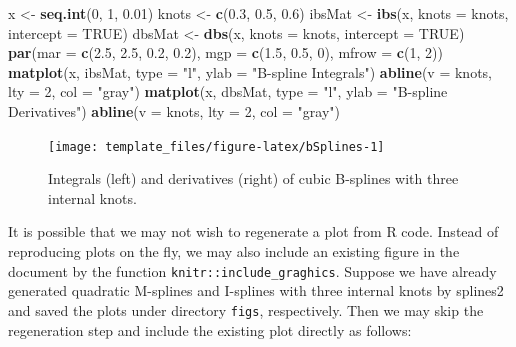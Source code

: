 \documentclass[11pt,letterpaper,]{article}
\newenvironment{Shaded}{\begin{snugshade}}{\end{snugshade}}
\newcommand{\DataTypeTok}[1]{\textcolor[rgb]{0.13,0.29,0.53}{#1}}
\newcommand{\DecValTok}[1]{\textcolor[rgb]{0.00,0.00,0.81}{#1}}
\newcommand{\FloatTok}[1]{\textcolor[rgb]{0.00,0.00,0.81}{#1}}
\newcommand{\KeywordTok}[1]{\textcolor[rgb]{0.13,0.29,0.53}{\textbf{#1}}}
\newcommand{\NormalTok}[1]{#1}
\newcommand{\OtherTok}[1]{\textcolor[rgb]{0.56,0.35,0.01}{#1}}
\newcommand{\StringTok}[1]{\textcolor[rgb]{0.31,0.60,0.02}{#1}}
\newcommand{\pkg}[1]{{\normalfont\fontseries{b}\selectfont #1}}
\let\proglang=\textsf
\theoremstyle{definition}
\theoremstyle{definition}
\theoremstyle{definition}
\theoremstyle{remark}
\begin{document}
\begin{Shaded}
\begin{Highlighting}[]
\NormalTok{x <-}\StringTok{ }\KeywordTok{seq.int}\NormalTok{(}\DecValTok{0}\NormalTok{, }\DecValTok{1}\NormalTok{, }\FloatTok{0.01}\NormalTok{)}
\NormalTok{knots <-}\StringTok{ }\KeywordTok{c}\NormalTok{(}\FloatTok{0.3}\NormalTok{, }\FloatTok{0.5}\NormalTok{, }\FloatTok{0.6}\NormalTok{)}
\NormalTok{ibsMat <-}\StringTok{ }\KeywordTok{ibs}\NormalTok{(x, }\DataTypeTok{knots =}\NormalTok{ knots, }\DataTypeTok{intercept =} \OtherTok{TRUE}\NormalTok{)}
\NormalTok{dbsMat <-}\StringTok{ }\KeywordTok{dbs}\NormalTok{(x, }\DataTypeTok{knots =}\NormalTok{ knots, }\DataTypeTok{intercept =} \OtherTok{TRUE}\NormalTok{)}
\KeywordTok{par}\NormalTok{(}\DataTypeTok{mar =} \KeywordTok{c}\NormalTok{(}\FloatTok{2.5}\NormalTok{, }\FloatTok{2.5}\NormalTok{, }\FloatTok{0.2}\NormalTok{, }\FloatTok{0.2}\NormalTok{), }\DataTypeTok{mgp =} \KeywordTok{c}\NormalTok{(}\FloatTok{1.5}\NormalTok{, }\FloatTok{0.5}\NormalTok{, }\DecValTok{0}\NormalTok{), }\DataTypeTok{mfrow =} \KeywordTok{c}\NormalTok{(}\DecValTok{1}\NormalTok{, }\DecValTok{2}\NormalTok{))}
\KeywordTok{matplot}\NormalTok{(x, ibsMat, }\DataTypeTok{type =} \StringTok{"l"}\NormalTok{, }\DataTypeTok{ylab =} \StringTok{"B-spline Integrals"}\NormalTok{)}
\KeywordTok{abline}\NormalTok{(}\DataTypeTok{v =}\NormalTok{ knots, }\DataTypeTok{lty =} \DecValTok{2}\NormalTok{, }\DataTypeTok{col =} \StringTok{"gray"}\NormalTok{)}
\KeywordTok{matplot}\NormalTok{(x, dbsMat, }\DataTypeTok{type =} \StringTok{"l"}\NormalTok{, }\DataTypeTok{ylab =} \StringTok{"B-spline Derivatives"}\NormalTok{)}
\KeywordTok{abline}\NormalTok{(}\DataTypeTok{v =}\NormalTok{ knots, }\DataTypeTok{lty =} \DecValTok{2}\NormalTok{, }\DataTypeTok{col =} \StringTok{"gray"}\NormalTok{)}
\end{Highlighting}
\end{Shaded}

\begin{figure}

{\centering \texttt{[image: template\_files/figure-latex/bSplines-1]} 

}

\caption{Integrals (left) and derivatives (right) of cubic
B-splines with three internal knots.}\label{fig:bSplines}
\end{figure}

It is possible that we may not wish to regenerate a plot from
\proglang{R} code. Instead of reproducing plots on the fly, we may also
include an existing figure in the document by the function
\texttt{knitr::include\_graghics}. Suppose we have already generated
quadratic M-splines and I-splines \citep{ramsay1988msplines} with three
internal knots by \pkg{splines2} and saved the plots under directory
\texttt{figs}, respectively. Then we may skip the regeneration step and
include the existing plot directly as follows:
\end{document}
